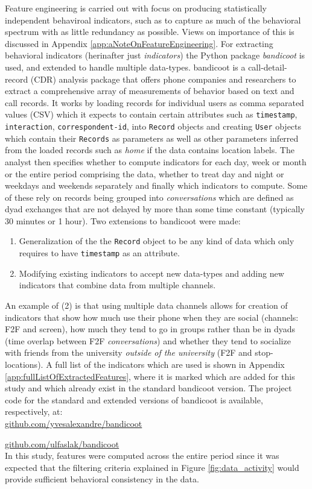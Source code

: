 Feature engineering is carried out with focus on producing statistically independent behaviroal indicators, such as to capture as much of the behavioral spectrum with as little redundancy as possible. Views on importance of this is discussed in Appendix \ref{app:aNoteOnFeatureEngineering}. For extracting behavioral indicators (herinafter just \textit{indicators}) the Python package \textit{bandicoot} is used, and extended to handle multiple data-types. bandicoot is a call-detail-record (CDR) analysis package that offers phone companies and researchers to extract a comprehensive array of measurements of behavior based on text and call records. It works by loading records for individual users as comma separated values (CSV) which it expects to contain certain attributes such as \texttt{timestamp}, \texttt{interaction}, \texttt{correspondent-id}, into \texttt{Record} objects and creating \texttt{User} objects which contain their \texttt{Records} as parameters as well as other parameters inferred from the loaded records such as \textit{home} if the data contains location labels. The analyst then specifies whether to compute indicators for each day, week or month or the entire period comprising the data, whether to treat day and night or weekdays and weekends separately and finally which indicators to compute. Some of these rely on records being grouped into \textit{conversations} which are defined as dyad exchanges that are not delayed by more than some time constant (typically 30 minutes or 1 hour). Two extensions to bandicoot were made:
\begin{enumerate}
	\item Generalization of the the \texttt{Record} object to be any kind of data which only requires to have \texttt{timestamp} as an attribute.
	\item Modifying existing indicators to accept new data-types and adding new indicators that combine data from multiple channels.
\end{enumerate}
 
An example of (2) is that using multiple data channels allows for creation of indicators that show how much use their phone when they are social (channels: F2F and screen), how much they tend to go in groups rather than be in dyads (time overlap between F2F \textit{conversations}) and whether they tend to socialize with friends from the university \textit{outside of the university} (F2F and stop-locations). A full list of the indicators which are used is shown in Appendix \ref{app:fullListOfExtractedFeatures}, where it is marked which are added for this study and which already exist in the standard bandicoot version. The project code for the standard and extended versions of bandicoot is available, respectively, at:\\

\url{github.com/yvesalexandre/bandicoot}

\url{github.com/ulfaslak/bandicoot}\\

In this study, features were computed across the entire period since it was expected that the filtering criteria explained in Figure \ref{fig:data_activity} would provide sufficient behavioral consistency in the data.